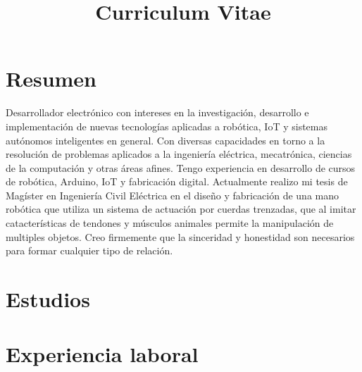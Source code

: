 \documentclass[11pt,a4paper,roman]{moderncv} %
\title{Curriculum Vitae}
\begin{document}
\makecvtitle %
\section{Resumen}
Desarrollador electr\'onico con intereses en la investigaci\'on, desarrollo e implementaci\'on de nuevas tecnolog\'ias aplicadas a rob\'otica, IoT y sistemas aut\'onomos inteligentes en general. Con diversas capacidades en torno a la resoluci\'on de problemas aplicados a la ingenier\'ia el\'ectrica, mecatr\'onica, ciencias de la computaci\'on y otras \'areas afines. Tengo experiencia en desarrollo de cursos de rob\'otica, Arduino, IoT y fabricaci\'on digital.
Actualmente realizo mi tesis de Mag\'ister en Ingenier\'ia Civil El\'ectrica en el dise\~no y fabricaci\'on de una mano rob\'otica que utiliza un sistema de actuaci\'on por cuerdas trenzadas, que al imitar catacter\'isticas de tendones y m\'usculos animales permite la manipulaci\'on de multiples objetos.
Creo firmemente que la sinceridad y honestidad son necesarios para formar cualquier tipo de relaci\'on.



\section{Estudios}





\section{Experiencia laboral}
\end{document}

